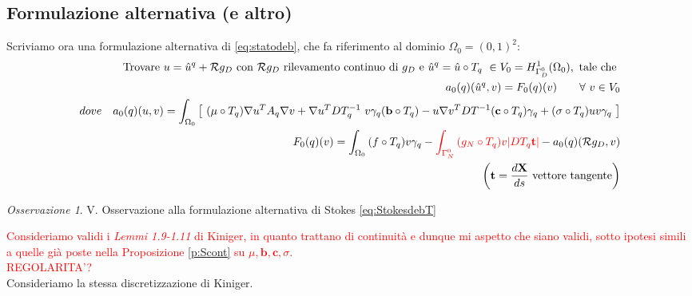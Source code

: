 \documentclass[a4paper,11pt]{article}
\theoremstyle{remark}
\newtheorem{oss}{Osservazione}
\begin{document}
\subsection{Formulazione alternativa (e altro)}
Scriviamo ora una formulazione alternativa di \eqref{eq:statodeb}, che fa riferimento al dominio $\Omega_0=(0,1)^2$:
\begin{equation}
	\begin{aligned}
\text{Trovare } u = \hat{u}^q+\mathcal{R}g_D \text{ con } \mathcal{R}g_D \text{ rilevamento continuo di } g_D \text{ e } \hat{u}^q=\hat{u}\circ T_q\ \in V_0=H^1_{\Gamma_D^0}(\Omega_0), \text{ tale che } \\
	 a_0(q)(\hat{u}^q,v)=F_0(q)(v)\qquad\forall\ v\in V_0\\
	dove\quad a_0(q)(u,v)=\int_{\Omega_0}{\left[\ (\mu\circ T_q)\nabla u^TA_q\nabla v +\nabla u^T DT_q^{-1}\ v \gamma_q (\mathbf{b}\circ T_q)-u \nabla v^T DT^{-1}(\mathbf{c}\circ T_q)\gamma_q+(\sigma\circ T_q) u v\gamma_q\ \right]}\\
	\qquad F_0(q)(v) = \int_{\Omega_0}{(f\circ T_q) v\gamma_q}-\textcolor{red}{\int_{\Gamma_N^0} {(g_N\circ T_q) v |DT_q \mathbf{t}|}}-a_0(q)(\mathcal{R}g_D,v)\\
	\left(\mathbf{t} = \frac{d\mathbf{X}}{ds} \text{ vettore tangente}\right)
	\end{aligned}
\label{eq:statodebT}
\end{equation}
\begin{oss}
 V. Osservazione alla formulazione alternativa di Stokes \eqref{eq:StokesdebT}
\end{oss}

\textcolor{red}{Consideriamo validi i \emph{Lemmi 1.9-1.11} di Kiniger, in quanto trattano di continuit\`a e dunque mi aspetto che siano validi, sotto ipotesi simili a quelle gi\`a poste nella Proposizione \ref{p:Scont} su $\mu,\mathbf{b},\mathbf{c},\sigma$.}\\
\textcolor{red}{REGOLARITA'?}\\
Consideriamo la stessa discretizzazione di Kiniger.\\
\end{document}
